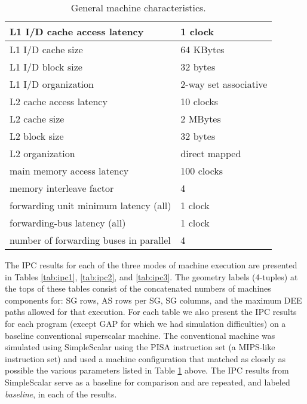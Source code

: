 \documentclass[10pt,dvips]{article}
\begin{document}
\begin{table}
\begin{center}
\caption{General machine characteristics.}
\label{tab:params}
\begin{tabular}{|l|l|}
\hline 
L1 I/D cache access latency&1 clock\\
\hline
L1 I/D cache size&64 KBytes\\
\hline
L1 I/D block size&32 bytes\\
\hline
L1 I/D organization&2-way set associative\\
\hline
L2 cache access latency&10 clocks\\
\hline
L2 cache size&2 MBytes\\
\hline
L2 block size&32 bytes\\
\hline
L2 organization&direct mapped\\
\hline
main memory access latency&100 clocks\\
\hline
memory interleave factor&4\\
\hline
forwarding unit minimum latency (all)&1 clock\\
\hline
forwarding-bus latency (all)&1 clock\\
\hline
number of forwarding buses in parallel&4\\
\hline
\end{tabular}
\end{center}
\end{table}
%
The IPC results for each of the three modes of machine execution
are presented in Tables \ref{tab:ipc1}, \ref{tab:ipc2}, and \ref{tab:ipc3}.
The geometry labels (4-tuples) 
at the tops of these tables consist of the concatenated 
numbers of
machines components for: SG rows, AS rows per SG, SG columns,
and the maximum DEE paths allowed for that execution.
For each table we also present the IPC results for each program
(except GAP for which we had simulation difficulties) on a baseline
conventional superscalar machine.  The conventional machine was
simulated using SimpleScalar \cite{Austin97} using the PISA
instruction set (a MIPS-like instruction set) and 
used a machine configuration that
matched as closely as possible the various parameters listed
in Table \ref{tab:params} above.  
The IPC results from SimpleScalar
serve as a baseline for comparison and are repeated, and
labeled \textit{baseline}, in each of the results.
\end{document}
